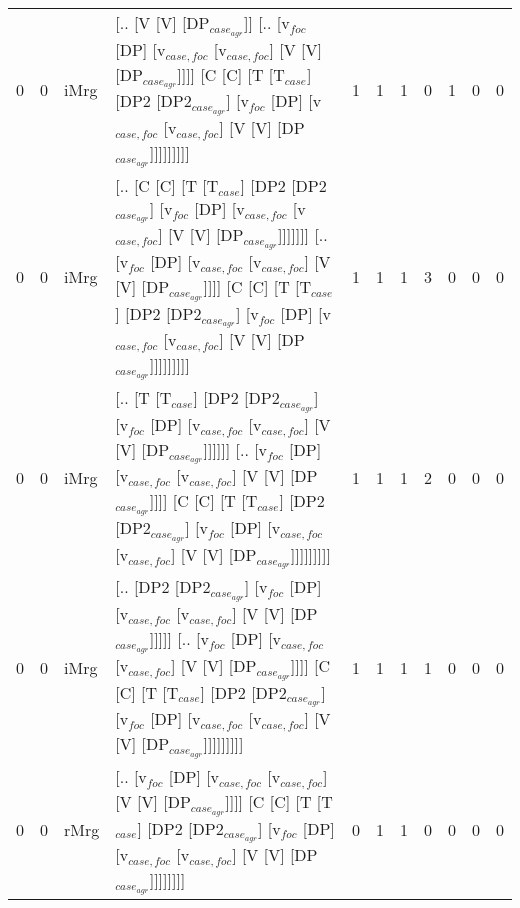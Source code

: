 \begin{tabularx}{\linewidth}{rrlXrrrrrrr}
   0 &   0 & iMrg & [.. [V [V] [DP$_{case_{agr}}$]] [.. [v$_{foc}$ [DP] [v$_{case,foc}$ [v$_{case,foc}$] [V [V] [DP$_{case_{agr}}$]]]] [C [C] [T [T$_{case}$] [DP2 [DP2$_{case_{agr}}$] [v$_{foc}$ [DP] [v$_{case,foc}$ [v$_{case,foc}$] [V [V] [DP$_{case_{agr}}$]]]]]]]]]                                                                                  &            1 &             1 &             1 &             0 &                  1 &              0 &             0 \\
   0 &   0 & iMrg & [.. [C [C] [T [T$_{case}$] [DP2 [DP2$_{case_{agr}}$] [v$_{foc}$ [DP] [v$_{case,foc}$ [v$_{case,foc}$] [V [V] [DP$_{case_{agr}}$]]]]]]] [.. [v$_{foc}$ [DP] [v$_{case,foc}$ [v$_{case,foc}$] [V [V] [DP$_{case_{agr}}$]]]] [C [C] [T [T$_{case}$] [DP2 [DP2$_{case_{agr}}$] [v$_{foc}$ [DP] [v$_{case,foc}$ [v$_{case,foc}$] [V [V] [DP$_{case_{agr}}$]]]]]]]]] &            1 &             1 &             1 &             3 &                  0 &              0 &             0 \\
   0 &   0 & iMrg & [.. [T [T$_{case}$] [DP2 [DP2$_{case_{agr}}$] [v$_{foc}$ [DP] [v$_{case,foc}$ [v$_{case,foc}$] [V [V] [DP$_{case_{agr}}$]]]]]] [.. [v$_{foc}$ [DP] [v$_{case,foc}$ [v$_{case,foc}$] [V [V] [DP$_{case_{agr}}$]]]] [C [C] [T [T$_{case}$] [DP2 [DP2$_{case_{agr}}$] [v$_{foc}$ [DP] [v$_{case,foc}$ [v$_{case,foc}$] [V [V] [DP$_{case_{agr}}$]]]]]]]]]         &            1 &             1 &             1 &             2 &                  0 &              0 &             0 \\
   0 &   0 & iMrg & [.. [DP2 [DP2$_{case_{agr}}$] [v$_{foc}$ [DP] [v$_{case,foc}$ [v$_{case,foc}$] [V [V] [DP$_{case_{agr}}$]]]]] [.. [v$_{foc}$ [DP] [v$_{case,foc}$ [v$_{case,foc}$] [V [V] [DP$_{case_{agr}}$]]]] [C [C] [T [T$_{case}$] [DP2 [DP2$_{case_{agr}}$] [v$_{foc}$ [DP] [v$_{case,foc}$ [v$_{case,foc}$] [V [V] [DP$_{case_{agr}}$]]]]]]]]]                      &            1 &             1 &             1 &             1 &                  0 &              0 &             0 \\
   0 &   0 & rMrg & [.. [v$_{foc}$ [DP] [v$_{case,foc}$ [v$_{case,foc}$] [V [V] [DP$_{case_{agr}}$]]]] [C [C] [T [T$_{case}$] [DP2 [DP2$_{case_{agr}}$] [v$_{foc}$ [DP] [v$_{case,foc}$ [v$_{case,foc}$] [V [V] [DP$_{case_{agr}}$]]]]]]]]                                                                                                             &            0 &             1 &             1 &             0 &                  0 &              0 &             0 \\
\hline
\end{tabularx}\endgroup\\
